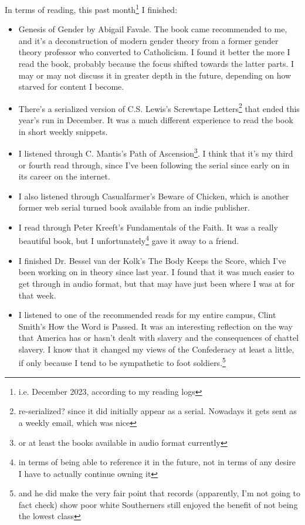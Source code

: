 \documentclass[12pt]{article}[titlepage]
\newcommand{\1}{\={a}}
\newcommand{\2}{\={e}}
\newcommand{\3}{\={\i}}
\newcommand{\4}{\=o}
\newcommand{\5}{\=u}
\newcommand{\6}{\={A}}
\renewcommand{\,}{\textsuperscript{,}}
\begin{document}
In terms of reading, this past month\footnote{i.e. December 2023, according to my reading logs} I finished:
\begin{itemize}
\item Genesis of Gender by Abigail Favale. The book came recommended to me, and it's a deconstruction of modern gender theory from a former gender theory professor who converted to Catholicism.
I found it better the more I read the book, probably because the focus shifted towards the latter parts.
I may or may not discuss it in greater depth in the future, depending on how starved for content I become.
\item There's a serialized version of C.S. Lewis's Screwtape Letters\footnote{re-serialized? since it did initially appear as a serial. Nowadays it gets sent as a weekly email, which was nice} that ended this year's run in December.
It was a much different experience to read the book in short weekly snippets.
\item I listened through C. Mantis's Path of Ascension\footnote{or at least the books available in audio format currently}. I think that it's my third or fourth read through, since I've been following the serial since early on in its career on the internet.
\item I also listened through Casualfarmer's Beware of Chicken, which is another former web serial turned book available from an indie publisher.
\item I read through Peter Kreeft's Fundamentals of the Faith. It was a really beautiful book, but I unfortunately\footnote{in terms of being able to reference it in the future, not in terms of any desire I have to actually continue owning it} gave it away to a friend.
\item I finished Dr. Bessel van der Kolk's The Body Keeps the Score, which I've been working on in theory since last year.
I found that it was much easier to get through in audio format, but that may have just been where I was at for that week.
\item I listened to one of the recommended reads for my entire campus, Clint Smith's How the Word is Passed. It was an interesting reflection on the way that America has or hasn't dealt with slavery and the consequences of chattel slavery.
I know that it changed my views of the Confederacy at least a little, if only because I tend to be sympathetic to foot soldiers.\footnote{and he did make the very fair point that records (apparently, I'm not going to fact check) show poor white Southerners still enjoyed the benefit of not being the lowest class}

\end{itemize}
\end{document}
